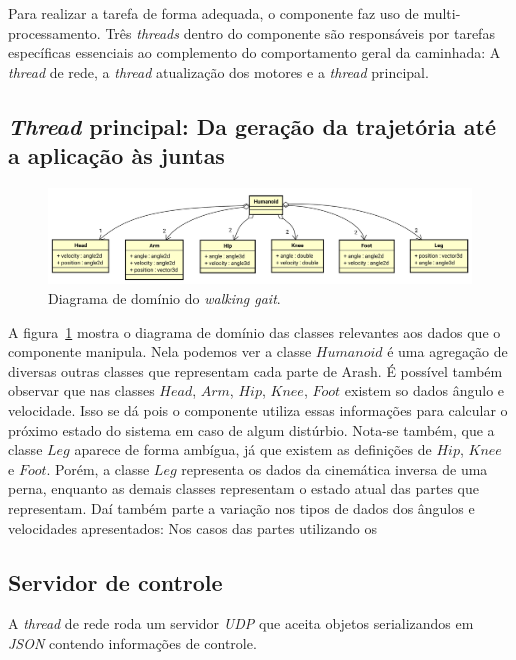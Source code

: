 Para realizar a tarefa de forma adequada, o componente faz uso de multi-processamento. Três \textit{threads} dentro do componente são responsáveis por tarefas específicas essenciais ao complemento do comportamento geral da caminhada: A \textit{thread} de rede, a \textit{thread} atualização dos motores e a \textit{thread} principal.

\subsection{\textit{Thread} principal: Da geração da trajetória até a aplicação às juntas}

\begin{figure}[h!]
	\centering
	\includegraphics[scale=0.4]{imagens/svg/walkinggait-domain}
	\caption{Diagrama de domínio do \textit{walking gait}.}
	\label{fig:walkinggait:domain}
\end{figure}

A figura~\ref{fig:walkinggait:domain} mostra o diagrama de domínio das classes relevantes aos dados que o componente manipula. Nela podemos ver a classe $Humanoid$ é uma agregação de diversas outras classes que representam cada parte de Arash. É possível também observar que nas classes $Head$, $Arm$, $Hip$, $Knee$, $Foot$ existem so dados ângulo e velocidade. Isso se dá pois o componente utiliza essas informações para calcular o próximo estado do sistema em caso de algum distúrbio. Nota-se também, que a classe $Leg$ aparece de forma ambígua, já que existem as definições de $Hip$, $Knee$ e $Foot$. Porém, a classe $Leg$ representa os dados da cinemática inversa de uma perna, enquanto as demais classes representam o estado atual das partes que representam. Daí também parte a variação nos tipos de dados dos ângulos e velocidades apresentados: Nos casos das partes utilizando os 

\subsection{Servidor de controle}

A \textit{thread} de rede roda um servidor \textit{UDP} que aceita objetos serializandos em \textit{JSON} contendo informações de controle.